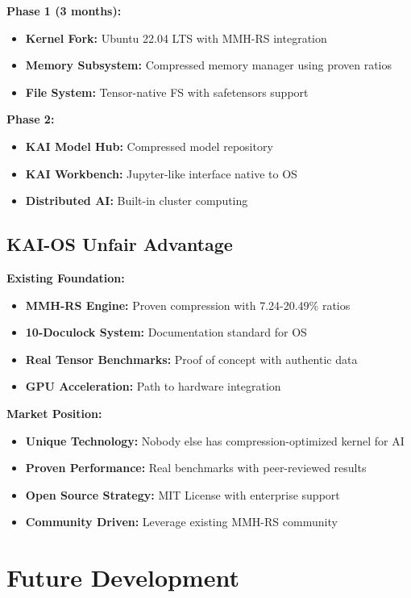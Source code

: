 \documentclass[12pt,a4paper]{article}
\begin{document}
\textbf{Phase 1 (3 months):}
\begin{itemize}
    \item \textbf{Kernel Fork:} Ubuntu 22.04 LTS with MMH-RS integration
    \item \textbf{Memory Subsystem:} Compressed memory manager using proven ratios
    \item \textbf{File System:} Tensor-native FS with safetensors support
\end{itemize}

\textbf{Phase 2:}
\begin{itemize}
    \item \textbf{KAI Model Hub:} Compressed model repository
    \item \textbf{KAI Workbench:} Jupyter-like interface native to OS
    \item \textbf{Distributed AI:} Built-in cluster computing
\end{itemize}

\subsection{KAI-OS Unfair Advantage}

\textbf{Existing Foundation:}
\begin{itemize}
    \item \textbf{MMH-RS Engine:} Proven compression with 7.24-20.49\% ratios
    \item \textbf{10-Doculock System:} Documentation standard for OS
    \item \textbf{Real Tensor Benchmarks:} Proof of concept with authentic data
    \item \textbf{GPU Acceleration:} Path to hardware integration
\end{itemize}

\textbf{Market Position:}
\begin{itemize}
    \item \textbf{Unique Technology:} Nobody else has compression-optimized kernel for AI
    \item \textbf{Proven Performance:} Real benchmarks with peer-reviewed results
    \item \textbf{Open Source Strategy:} MIT License with enterprise support
    \item \textbf{Community Driven:} Leverage existing MMH-RS community
\end{itemize}

\section{Future Development}
\end{document}
